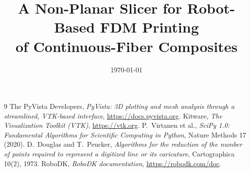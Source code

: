 \documentclass[11pt,a4paper]{article}
\title{A Non-Planar Slicer for Robot-Based FDM Printing\\of Continuous-Fiber Composites}
\author{}
\date{\today}
\begin{document}
\maketitle
\tableofcontents
\newpage








\begin{thebibliography}{9}
   The PyVista Developers, \emph{PyVista: 3D plotting and mesh analysis through a streamlined, VTK-based interface}, \url{https://docs.pyvista.org}.
   Kitware, \emph{The Visualization Toolkit (VTK)}, \url{https://vtk.org}.
   P.~Virtanen et al., \emph{SciPy 1.0: Fundamental Algorithms for Scientific Computing in Python}, Nature Methods 17 (2020).
   D.~Douglas and T.~Peucker, \emph{Algorithms for the reduction of the number of points required to represent a digitized line or its caricature}, Cartographica 10(2), 1973.
   RoboDK, \emph{RoboDK documentation}, \url{https://robodk.com/doc}.
\end{thebibliography}
\end{document}

